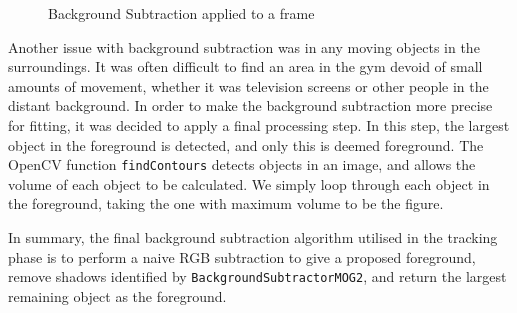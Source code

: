 \begin{figure}[H]
    \centering
\caption{Background Subtraction applied to a frame}
\label{fig:bgsub}
\end{figure}

Another issue with background subtraction was in any moving objects in the surroundings. It was often difficult to find an area in the gym devoid of small amounts of movement, whether it was television screens or other people in the distant background. In order to make the background subtraction more precise for fitting, it was decided to apply a final processing step. In this step, the largest object in the foreground is detected, and only this is deemed foreground. The OpenCV function \texttt{findContours} detects objects in an image, and allows the volume of each object to be calculated. We simply loop through each object in the foreground, taking the one with maximum volume to be the figure.

In summary, the final background subtraction algorithm utilised in the tracking phase is to perform a naive RGB subtraction to give a proposed foreground, remove shadows identified by \texttt{BackgroundSubtractorMOG2}, and return the largest remaining object as the foreground.